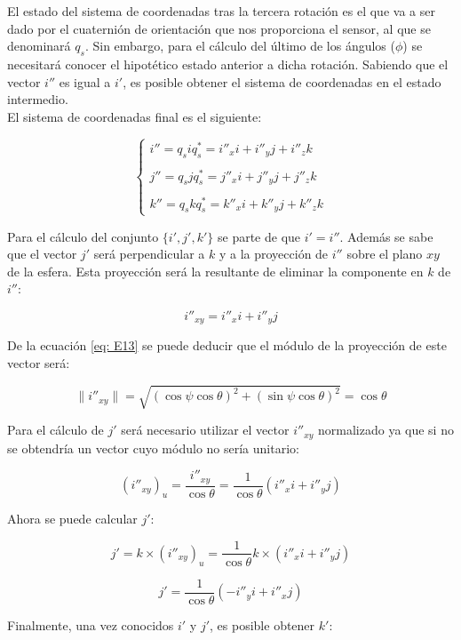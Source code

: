 \documentclass[12pt, a4paper]{report}
\begin{document}
El estado del sistema de coordenadas tras la tercera rotación es el que va a ser dado por el cuaternión de orientación que nos proporciona el sensor, al que se denominará $q_s$. Sin embargo, para el cálculo del último de los ángulos ($\phi$) se necesitará conocer el hipotético estado anterior a dicha rotación. Sabiendo que el vector $i''$ es igual a $i'$, es posible obtener el sistema de coordenadas en el estado intermedio.\\

El sistema de coordenadas final es el siguiente:

$$ \begin{cases}
i'' = q_siq_s^* = i''_x i + i''_y j + i''_z k \\
\\
j'' = q_sjq_s^* = j''_x i + j''_y j + j''_z k \\ 
\\
k'' = q_skq_s^* = k''_x i + k''_y j + k''_z k 
\end{cases}$$

Para el cálculo del conjunto $\{i', j', k'\}$ se parte de que $i' = i''$. Además se sabe que el vector $j'$ será perpendicular a $k$ y a la proyección de $i''$ sobre el plano $xy$ de la esfera. Esta proyección será la resultante de eliminar la componente en $k$ de $i''$:

$$ i''_{xy} = i''_x i + i''_y j $$

De la ecuación \eqref{eq: E13} se puede deducir que el módulo de la proyección de este vector será:

$$ \|i''_{xy}\| = \sqrt{\left(\cos \psi \cos \theta\right)^2 + \left(\sin \psi \cos \theta \right)^2} = \cos\theta$$

Para el cálculo de $j'$ será necesario utilizar el vector $i''_{xy}$ normalizado ya que si no se obtendría un vector cuyo módulo no sería unitario: 

$$ \left( i''_{xy} \right)_u = \frac{i''_{xy}}{\cos\theta} = \frac{1}{\cos\theta}\left( i''_x i + i''_y j \right) $$

Ahora se puede calcular $j'$:

$$ j' = k \times \left( i''_{xy} \right)_u = \frac{1}{\cos\theta} k \times\left( i''_x i + i''_y j \right) $$

\begin{equation}
j' = \frac{1}{\cos\theta} \left( - i''_y i + i''_x j \right)
\end{equation}
  
Finalmente, una vez conocidos $i'$ y $j'$, es posible obtener $k'$:
\end{document}
